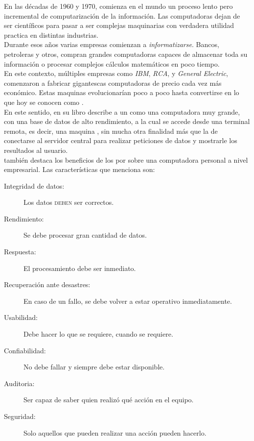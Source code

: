 En las décadas de 1960 y 1970, comienza en el mundo un proceso lento pero incremental de
computarización de la información. Las computadoras dejan de ser 
científicos para pasar a ser complejas maquinarias con verdadera utilidad practica
en distintas industrias.\\
Durante esos años varias empresas comienzan a \emph{informatizarse}. Bancos, petroleras
y otros, compran grandes computadoras capaces de almacenar toda su información o procesar
complejos cálculos matemáticos en poco tiempo.\\
En este contexto, múltiples empresas como \emph{IBM}, \emph{RCA}, y 
\emph{General Electric}, comenzaron a fabricar gigantescas computadoras de precio cada
vez más económico. Estas maquinas evolucionarían poco a poco hasta convertirse en lo que
hoy se conocen como \mainframes.\\
En este sentido,  en su libro
  describe a un \mainframe
como una computadora muy grande, con una base de datos de alto rendimiento, a la cual se
accede desde una terminal remota, es decir, una maquina , sin mucha otra
finalidad más que la de conectarse al servidor central para realizar peticiones de datos
y mostrarle los resultados al usuario.\\
\citeauthor{Stephens:2008:BOOK} también destaca los beneficios de los \mainframes por
sobre una computadora personal a nivel empresarial. Las características que menciona son:
\begin{description}
	\item[Integridad de datos:] Los datos \textsc{deben} ser correctos.
	\item[Rendimiento:] Se debe procesar gran cantidad de datos.
	\item[Respuesta:] El procesamiento debe ser inmediato.
	\item[Recuperación ante desastres:] En caso de un fallo, se debe volver a estar
	operativo inmediatamente.
	\item[Usabilidad:] Debe hacer lo que se requiere, cuando se requiere.
	\item[Confiabilidad:] No debe fallar y siempre debe estar disponible.
	\item[Auditoria:] Ser capaz de saber quien realizó qué acción en el equipo.
	\item[Seguridad:] Solo aquellos que pueden realizar una acción pueden hacerlo.
\end{description}
